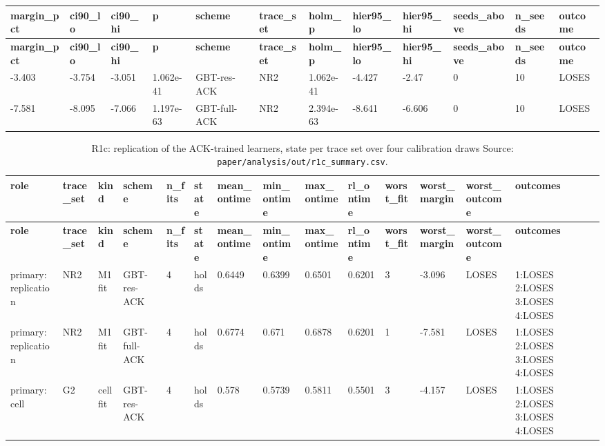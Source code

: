 \documentclass[10pt]{article}
\begin{document}
\begin{landscape}
\begin{longtable}{@{}llllllllllll@{}}
\toprule
\textbf{margin\_pct} & \textbf{ci90\_lo} & \textbf{ci90\_hi} & \textbf{p} & \textbf{scheme} & \textbf{trace\_set} & \textbf{holm\_p} & \textbf{hier95\_lo} & \textbf{hier95\_hi} & \textbf{seeds\_above} & \textbf{n\_seeds} & \textbf{outcome} \\
\midrule
\endfirsthead
\toprule
\textbf{margin\_pct} & \textbf{ci90\_lo} & \textbf{ci90\_hi} & \textbf{p} & \textbf{scheme} & \textbf{trace\_set} & \textbf{holm\_p} & \textbf{hier95\_lo} & \textbf{hier95\_hi} & \textbf{seeds\_above} & \textbf{n\_seeds} & \textbf{outcome} \\
\midrule
\endhead
-3.403 & -3.754 & -3.051 & 1.062e-41 & GBT-res-ACK & NR2 & 1.062e-41 & -4.427 & -2.47 & 0 & 10 & LOSES \\
-7.581 & -8.095 & -7.066 & 1.197e-63 & GBT-full-ACK & NR2 & 2.394e-63 & -8.641 & -6.606 & 0 & 10 & LOSES \\
\bottomrule
\end{longtable}
\normalsize
\tiny
\setlength{\tabcolsep}{2pt}
\begin{longtable}{@{}llllllllllllll@{}}
\caption{R1c: replication of the ACK-trained learners, state per trace set over four calibration draws Source: \texttt{paper/analysis/out/r1c\_summary.csv}.}\\
\toprule
\textbf{role} & \textbf{trace\_set} & \textbf{kind} & \textbf{scheme} & \textbf{n\_fits} & \textbf{state} & \textbf{mean\_ontime} & \textbf{min\_ontime} & \textbf{max\_ontime} & \textbf{rl\_ontime} & \textbf{worst\_fit} & \textbf{worst\_margin} & \textbf{worst\_outcome} & \textbf{outcomes} \\
\midrule
\endfirsthead
\toprule
\textbf{role} & \textbf{trace\_set} & \textbf{kind} & \textbf{scheme} & \textbf{n\_fits} & \textbf{state} & \textbf{mean\_ontime} & \textbf{min\_ontime} & \textbf{max\_ontime} & \textbf{rl\_ontime} & \textbf{worst\_fit} & \textbf{worst\_margin} & \textbf{worst\_outcome} & \textbf{outcomes} \\
\midrule
\endhead
primary: replication & NR2 & M1fit & GBT-res-ACK & 4 & holds & 0.6449 & 0.6399 & 0.6501 & 0.6201 & 3 & -3.096 & LOSES & 1:LOSES 2:LOSES 3:LOSES 4:LOSES \\
primary: replication & NR2 & M1fit & GBT-full-ACK & 4 & holds & 0.6774 & 0.671 & 0.6878 & 0.6201 & 1 & -7.581 & LOSES & 1:LOSES 2:LOSES 3:LOSES 4:LOSES \\
primary: cell & G2 & cellfit & GBT-res-ACK & 4 & holds & 0.578 & 0.5739 & 0.5811 & 0.5501 & 3 & -4.157 & LOSES & 1:LOSES 2:LOSES 3:LOSES 4:LOSES \\

\end{longtable}
\end{landscape}
\end{document}
